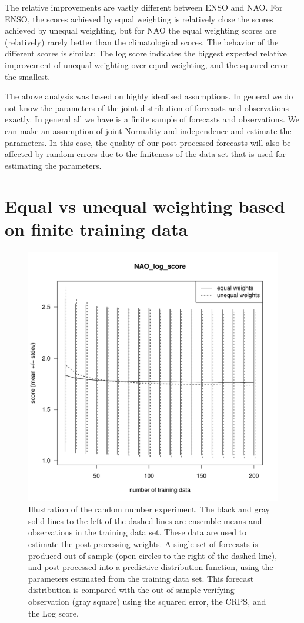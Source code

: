 \documentclass[12pt]{article}
\begin{document}
The relative improvements are vastly different between ENSO and NAO.
For ENSO, the scores achieved by equal weighting is relatively close the scores achieved by unequal weighting, but for NAO the equal weighting scores are (relatively) rarely better than the climatological scores.
The behavior of the different scores is similar: The log score indicates the biggest expected relative improvement of unequal weighting over equal weighting, and the squared error the smallest.


The above analysis was based on highly idealised assumptions.
In general we do not know the parameters of the joint distribution of forecasts and observations exactly.
In general all we have is a finite sample of forecasts and observations.
We can make an assumption of joint Normality and independence and estimate the parameters.
In this case, the quality of our post-processed forecasts will also be affected by random errors due to the finiteness of the data set that is used for estimating the parameters.

\section{Equal vs unequal weighting based on finite training data}


\begin{figure}
\centering
\includegraphics[width=.7\textwidth, page=9]{../R/n-dependence.pdf}
\caption{Illustration of the random number experiment. The black and gray solid lines to the left of the dashed lines are ensemble means and observations in the training data set. These data are used to estimate the post-processing weights. A single set of forecasts is produced out of sample (open circles to the right of the dashed line), and post-processed into a predictive distribution function, using the parameters estimated from the training data set. This forecast distribution is compared with the out-of-sample verifying observation (gray square) using the squared error, the CRPS, and the Log score.}
\end{figure}
\end{document}
